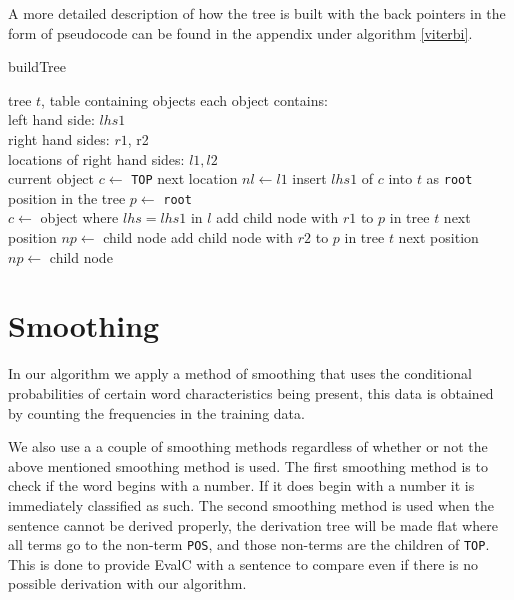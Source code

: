 \documentclass[11pt,twocolumn]{article}
\begin{document}
A more detailed description of how the tree is built with the back pointers in the form of pseudocode can be found in the appendix under algorithm \ref{viterbi}.
\begin{algorithm}[!htb]
\caption{buildTree}
\label{viterbi}
\begin{algorithmic}[1]
\Require tree $t$, table containing objects
\Ensure each object contains: \\
left hand side: $lhs1$\\right hand sides: $r1$, r2\\
locations of right hand sides: $l1, l2$
\\
\State current object $c \gets$ \texttt{TOP} 
\State next location $nl \gets l1$
\State insert $lhs1$ of $c$ into $t$ as \texttt{root}
\State position in the tree $p \gets$ \texttt{root}
\State {}
\\
\State $c \gets$ object where $lhs=lhs1$ in $l$
\State add child node with $r1$ to $p$ in tree $t$
\State next position $np \gets$ child node
\State {} 
\State add child node with $r2$ to $p$ in tree $t$
\State next position $np \gets$ child node
\State {} 
\EndIf
\EndProcedure
\end{algorithmic}
\end{algorithm}

\section{Smoothing}
In our algorithm we apply a method of smoothing that uses the conditional probabilities of certain word characteristics being present, this data is obtained by counting the frequencies in the training data.

We also use a a couple of smoothing methods regardless of whether or not the above mentioned smoothing method is used. The first smoothing method is to check if the word begins with a number. If it does begin with a number it is immediately classified as such. The second smoothing method is used when the sentence cannot be derived properly, the derivation tree will be made flat where all terms go to the non-term \texttt{POS}, and those non-terms are the children of \texttt{TOP}. This is done to provide EvalC with a sentence to compare even if there is no possible derivation with our algorithm.
\end{document}
